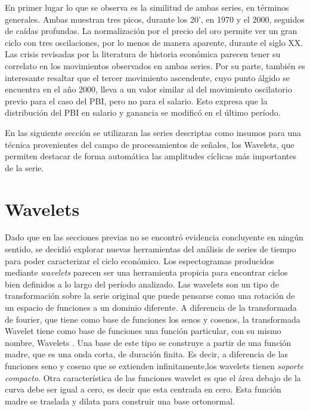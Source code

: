 \documentclass[a4paper]{article}
\begin{document}
En primer lugar lo que se observa es la similitud de ambas series, en términos generales. Ambas muestran tres picos, durante los 20', en 1970 y el 2000, seguidos de caídas profundas. La normalización por el precio del oro permite ver un gran ciclo con tres oscilaciones, por lo menos de manera aparente, durante el siglo XX. Las crisis revisadas por la literatura de historia económica parecen tener su correlato en los movimientos observados en ambas series. Por su parte, también es interesante resaltar que el tercer movimiento ascendente, cuyo punto álgido se encuentra en el año 2000, lleva a un valor similar al del movimiento oscilatorio previo para el caso del PBI, pero no para el salario. Esto expresa que la distribución del PBI en salario y ganancia se modificó en el último período. 

En las siguiente sección se utilizaran las series descriptas como insumos para una técnica provenientes del campo de procesamientos de señales, los Wavelets, que permiten destacar de forma automática las amplitudes cíclicas más importantes de la serie.


\section{Wavelets}

Dado que en las secciones previas no se encontró evidencia concluyente en ningún sentido, se decidió explorar nuevas herramientas del análisis de series de tiempo para poder caracterizar el ciclo económico. Los espectogramas producidos mediante \textit{wavelets} parecen ser una herramienta propicia para encontrar ciclos bien definidos a lo largo del período analizado. Las wavelets son un tipo de transformación sobre la serie original que puede pensarse como una rotación de un espacio de funciones a un dominio diferente. A diferencia de la transformada de fourier, que tiene como base de funciones los senos y cosenos, la transformada Wavelet tiene como base de funciones una función particular, con su mismo nombre, Wavelets \cite{castro1995wavelets}. Una base de este tipo se construye a partir de una función madre, que es una onda corta, de duración finita. Es decir, a diferencia de las funciones seno y coseno que se extienden infinitamente,los wavelets tienen \textit{soporte compacto}. Otra característica de las funciones wavelet es que el área debajo de la curva debe ser igual a cero, es decir que esta centrada en cero. Esta función madre se traslada y dilata para construir una base ortonormal. 
\end{document}
